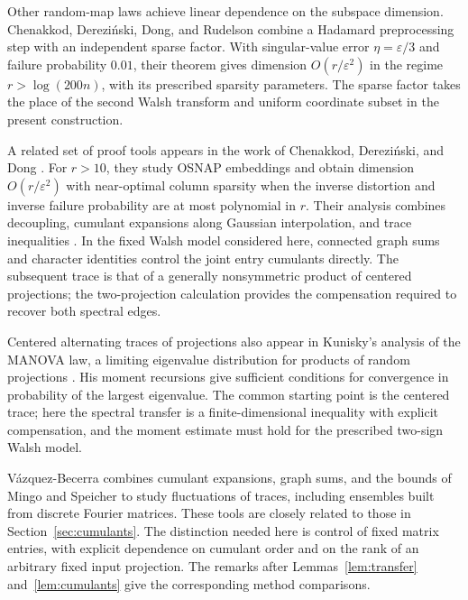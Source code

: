 \documentclass[11pt]{article}
\theoremstyle{definition}
\theoremstyle{remark}
\theoremstyle{plain}
\begin{document}
Other random-map laws achieve linear dependence on the subspace
dimension. Chenakkod, Derezi\'nski, Dong, and Rudelson
\cite[Theorem~4.5]{cddr_sparse} combine a Hadamard preprocessing step
with an independent sparse factor. With singular-value error
$\eta=\varepsilon/3$ and failure probability $0.01$, their theorem
gives dimension $O(r/\varepsilon^2)$ in the regime
$r>\log(200n)$, with its prescribed sparsity parameters.
The sparse factor takes the place of the second Walsh transform
and uniform coordinate subset in the present construction.

A related set of proof tools appears in the work of Chenakkod,
Derezi\'nski, and Dong \cite[Theorems~3 and~7]{cdd_icalp2025}.
For $r>10$, they study OSNAP embeddings and obtain dimension $O(r/\varepsilon^2)$
with near-optimal column sparsity when the inverse distortion and
inverse failure probability are at most polynomial in $r$.
Their analysis combines decoupling, cumulant expansions along
Gaussian interpolation, and trace inequalities
\cite[Section~4; full version, Sections~7.2--7.5]{cdd_icalp2025}.
In the fixed Walsh model considered here, connected graph
sums and character identities control the joint entry cumulants
directly. The subsequent trace is that of a generally nonsymmetric
product of centered projections; the two-projection calculation
provides the compensation required to recover both spectral edges.

Centered alternating traces of projections also appear in Kunisky's
analysis of the MANOVA law, a limiting eigenvalue distribution
for products of random projections
\cite[Theorems~1.5 and~1.12]{kunisky_manova}.
His moment recursions give sufficient conditions for convergence
in probability of the largest eigenvalue. The common starting point is the
centered trace; here the spectral transfer is a finite-dimensional
inequality with explicit compensation, and the moment estimate
must hold for the prescribed two-sign Walsh model.

V\'azquez-Becerra \cite[Section~4]{vazquez_becerra} combines
cumulant expansions, graph sums, and the bounds of Mingo and
Speicher to study fluctuations of traces, including ensembles
built from discrete Fourier matrices. These tools are closely
related to those in Section~\ref{sec:cumulants}. The distinction
needed here is control of fixed matrix entries, with explicit
dependence on cumulant order and on the rank of an arbitrary
fixed input projection. The remarks after
Lemmas~\ref{lem:transfer} and~\ref{lem:cumulants} give the
corresponding method comparisons.
\end{document}
